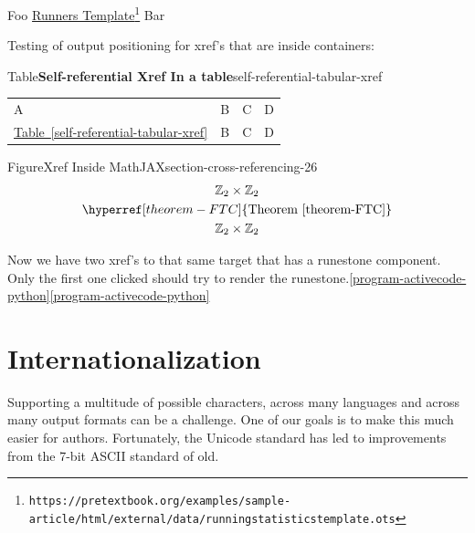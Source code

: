 \documentclass{sn-jnl}
\theoremstyle{thmstyleone}%
\theoremstyle{thmstyletwo}%
\theoremstyle{thmstylethree}%
\newcommand{\tabularfont}{\relax}
\newcommand{\xreffont}{\relax}
\numberwithin{equation}{section}
\newcommand{\hrulemedium}{\noalign{\hrule height 0.07em}}
\begin{document}
\par
Foo \href{https://pretextbook.org/examples/sample-article/html/external/data/runningstatisticstemplate.ots}{Runners Template}\footnote{\nolinkurl{https://pretextbook.org/examples/sample-article/html/external/data/runningstatisticstemplate.ots}\label{section-cross-referencing-23-2}} Bar%
\par
Testing of output positioning for xref's that are inside containers:%
\begin{tableptx}{Table}{\textbf{Self-referential Xref In a table}}{self-referential-tabular-xref}{}%
\centering%
{\tabularfont%
\begin{tabular}{llll}
A&B&C&D\tabularnewline\hrulemedium
\hyperref[self-referential-tabular-xref]{Table~{\xreffont\ref{self-referential-tabular-xref}}}&B&C&D
\end{tabular}
}%
\end{tableptx}%
\begin{figureptx}{Figure}{Xref Inside MathJAX}{section-cross-referencing-26}{}%
\centering
%
\begin{gather*}
{\mathbb Z}_2 \times {\mathbb Z}_2\\
\hyperref[theorem-FTC]{\text{Theorem {\xreffont\ref{theorem-FTC}}}}\\
{\mathbb Z}_2 \times {\mathbb Z}_2
\end{gather*}
%
\tcblower
\end{figureptx}%
Now we have two xref's to that same target that has a runestone component. Only the first one clicked should try to render the runestone.\hyperref[program-activecode-python]{{\xreffont\ref{program-activecode-python}}}\hyperref[program-activecode-python]{{\xreffont\ref{program-activecode-python}}}%
%
%
\typeout{************************************************}
\typeout{************************************************}
%
\section{Internationalization}\label{section-internationalization}%
%
Supporting a multitude of possible characters, across many languages and across many output formats can be a challenge.  One of our goals is to make this much easier for authors.  Fortunately, the Unicode standard has led to improvements from the 7-bit ASCII standard of old.%
\end{document}
